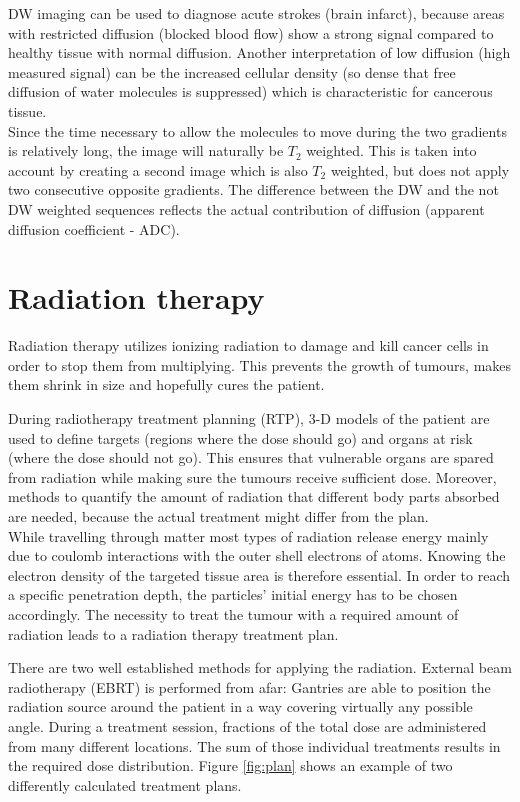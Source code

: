 DW imaging can be used to diagnose acute strokes (brain infarct), because areas with restricted diffusion (blocked blood flow) show a strong signal compared to healthy tissue with normal diffusion.
Another interpretation of low diffusion (high measured signal) can be the increased cellular density (so dense that free diffusion of water molecules is suppressed) which is characteristic for cancerous tissue.\\

Since the time necessary to allow the molecules to move during the two gradients is relatively long, the image will naturally be $T_2$ weighted.
This is taken into account by creating a second image which is also $T_2$ weighted, but does not apply two consecutive opposite gradients.
The difference between the DW and the not DW weighted sequences reflects the actual contribution of diffusion (apparent diffusion coefficient - ADC).


\section{Radiation therapy}
\label{sec:planning}
Radiation therapy utilizes ionizing radiation to damage and kill cancer cells in order to stop them from multiplying.
This prevents the growth of tumours, makes them shrink in size and hopefully cures the patient. 

During radiotherapy treatment planning (RTP), 3-D models of the patient are used to define targets (regions where the dose should go) and organs at risk (where the dose should not go).
This ensures that vulnerable organs are spared from radiation while making sure the tumours receive sufficient dose.
Moreover, methods to quantify the amount of radiation that different body parts absorbed are needed, because the actual treatment might differ from the plan.\\

While travelling through matter most types of radiation release energy mainly due to coulomb interactions with the outer shell electrons of atoms.
Knowing the electron density of the targeted tissue area is therefore essential.
In order to reach a specific penetration depth, the particles' initial energy has to be chosen accordingly.
The necessity to treat the tumour with a required amount of radiation leads to a radiation therapy treatment plan.

There are two well established methods for applying the radiation.
External beam radiotherapy (EBRT) is performed from afar:
Gantries are able to position the radiation source around the patient in a way covering virtually any possible angle.
During a treatment session, fractions of the total dose are administered from many different locations.
The sum of those individual treatments results in the required dose distribution.
Figure \ref{fig:plan} shows an example of two differently calculated treatment plans.

